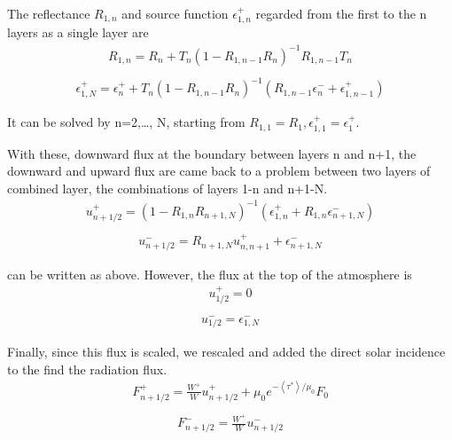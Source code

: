 The reflectance \(R_{1, n}\) and source function \(\epsilon_{1, n}^{+}\)
regarded from the first to the n layers as a single layer are \begin{equation}
\begin{array}{c}
R_{1, n}=R_{n}+T_{n}\left(1-R_{1, n-1} R_{n}\right)^{-1} R_{1, n-1} T_{n} \\
\end{array}
\end{equation} \begin{equation}
\begin{array}{c}
\epsilon_{1, N}^{+}=\epsilon_{n}^{+}+T_{n}\left(1-R_{1, n-1} R_{n}\right)^{-1}\left(R_{1, n-1} \epsilon_{n}^{-}+\epsilon_{1, n-1}^{+}\right)
\end{array}
\end{equation}

It can be solved by n=2,\ldots, N, starting from
\(R_{1,1}=R_{1}, \epsilon_{1,1}^{+}=\epsilon_{1}^{+}\).

With these, downward flux at the boundary between layers n and n+1, the
downward and upward flux are came back to a problem between two layers
of combined layer, the combinations of layers 1-n and n+1-N. \begin{equation}
\begin{array}{c}
u_{n+1 / 2}^{+}=\left(1-R_{1, n} R_{n+1, N}\right)^{-1}\left(\epsilon_{1, n}^{+}+R_{1, n} \epsilon_{n+1, N}^{-}\right) \\
\end{array}
\end{equation} \begin{equation}
\begin{array}{c}
u_{n+1 / 2}^{-}=R_{n+1, N} u_{n, n+1}^{+}+\epsilon_{n+1, N}^{-}
\end{array}
\end{equation}

can be written as above. However, the flux at the top of the atmosphere
is \begin{equation}
\begin{array}{c}
u_{1 / 2}^{+}=0 \\
\end{array}
\end{equation} \begin{equation}
\begin{array}{c}
u_{1 / 2}^{-}=\epsilon_{1, N}^{-}
\end{array}
\end{equation}

Finally, since this flux is scaled, we rescaled and added the direct
solar incidence to the find the radiation flux. \begin{equation}
\begin{array}{c}
F_{n+1 / 2}^{+}=\frac{W^{+}}{W} u_{n+1 / 2}^{+}+\mu_{0} e^{-\left\langle\tau^{*}\right\rangle / \mu_{0}} F_{0} \\
\end{array}
\end{equation} \begin{equation}
\begin{array}{c}
F_{n+1 / 2}^{-}=\frac{W^{+}}{W} u_{n+1 / 2}^{-}
\end{array}
\end{equation}

